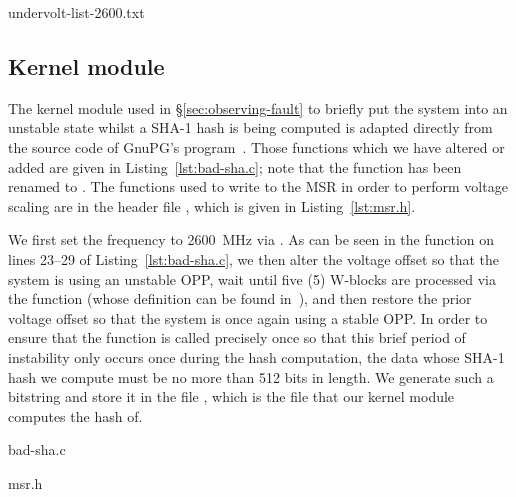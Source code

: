
    {undervolt-list-2600.txt}    

\subsection{Kernel module}
\label{sec:bad-sha}

The kernel module used in §\ref{sec:observing-fault} to briefly put the
system into an unstable state whilst a SHA-1 hash is being computed is adapted
directly from the source code of GnuPG's  program~\cite{gnupgSHA}.
Those functions which we have altered or added are given in Listing~\ref{lst:bad-sha.c};
note that the  function has been renamed to .
The functions used to write to the MSR in order to perform voltage scaling are
in the header file , which is given in Listing~\ref{lst:msr.h}.

We first set the frequency to 2600~MHz via . As can be seen in
the  function on lines 23–29 of Listing~\ref{lst:bad-sha.c},
we then alter the voltage offset so that the system is using an unstable OPP,
wait until five (5) W-blocks are processed via the  function (whose
definition can be found in~\cite{gnupgSHA}), and then restore the prior voltage
offset so that the system is once again using a stable OPP. In order to ensure
that the  function is called precisely once so that this brief
period of instability only occurs once during the hash computation, the data
whose SHA-1 hash we compute must be no more than 512 bits in length. We
generate such a bitstring and store it in the file ,
which is the file that our kernel module computes the hash of.


    {bad-sha.c}


    {msr.h}
